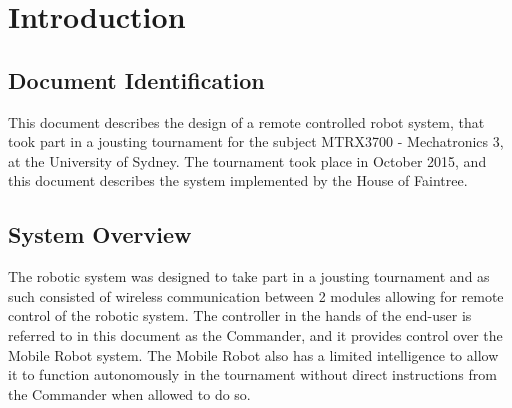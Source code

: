 


\section{Introduction}
\subsection{Document Identification}
  This document describes the design of a remote controlled robot system, that took part in a jousting tournament for the subject MTRX3700 - Mechatronics 3, at the University of Sydney. The tournament took place in October 2015, and this document describes the system implemented by the House of Faintree.
\subsection{System Overview}
  The robotic system was designed to take part in a jousting tournament and as such consisted of wireless communication between 2 modules allowing for remote control of the robotic system. The controller in the hands of the end-user is referred to in this document as the Commander, and it provides control over the Mobile Robot system. The Mobile Robot also has a limited intelligence to allow it to function autonomously in the tournament without direct instructions from the Commander when allowed to do so.
